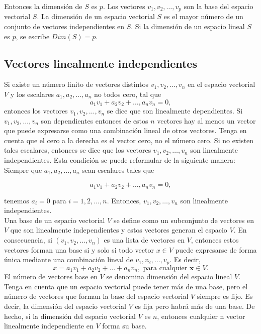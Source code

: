 Entonces la dimensión de $S$ es $p$. Los vectores $v_1, v_2, \ldots , v_p$ son la base del espacio vectorial $S$. La dimensión de un espacio vectorial $S$ es el mayor número de un conjunto de vectores independientes en $S$. Si la dimensión de un espacio lineal $S$ es $p$, se escribe $Dim(S) = p$.
 

\subsection{Vectores linealmente independientes}

Si existe un número finito de vectores distintos $v_1,v_2,\ldots,v_n$ en el espacio vectorial $V$ y los escalares $a_1,a_2,\ldots,a_n$ no todos cero, tal que
$$a_1v_1+a_2v_2+\ldots,a_nv_n=0,$$
entonces los vectores $v_1,v_2,\ldots,v_n$ se dice que son linealmente dependientes. Si $v_1,v_2,\ldots,v_n$ son dependientes entonces de estos $n$ vectores hay al menos un vector que puede expresarse como una combinación lineal de otros vectores. Tenga en cuenta que el cero a la derecha es el vector cero, no el número cero. Si no existen tales escalares, entonces se dice que los vectores $v_1, v_2, \ldots , v_n$ son linealmente independientes. Esta condición se puede reformular de la siguiente manera: Siempre que $a_1 , a_2 , \ldots , a_n$ sean escalares tales que

$$a_1v_1+a_2v_2+\ldots,a_nv_n=0,$$

tenemos $a_i=0$ para $i=1,2,\ldots,n$. Entonces, $v_1,v_2,\ldots,v_n$ son linealmente independientes.\\

Una base de un espacio vectorial $V$ se define como un subconjunto de vectores en $V$ que son linealmente independientes y estos vectores generan el espacio $V$. En consecuencia, si $(v_1 , v_2 , \ldots , v_n)$ es una lista de vectores en $V$, entonces estos vectores forman una base si y solo si todo vector $x \in V$ puede expresarse de forma única mediante una combinación lineal de $v_1 , v_2 , \ldots , v_p$. Es decir, 
$$x = a_1 v_1 + a_2 v_2 + \ldots + a_n v_n,\mbox{ para cualquier } \textbf{x}\in V.$$ 
El número de vectores base en $V$ se denomina dimensión del espacio lineal $V$. Tenga en cuenta que un espacio vectorial puede tener más de una base, pero el número de vectores que forman la base del espacio vectorial $V$ siempre es fijo. Es decir, la dimensión del espacio vectorial $V$ es fija pero habrá más de una base. De hecho, si la dimensión del espacio vectorial $V$ es $n$, entonces cualquier n vector linealmente independiente en $V$ forma su base.


